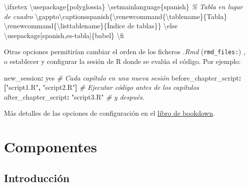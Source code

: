 \documentclass[
]{book}
\newenvironment{Shaded}{\begin{snugshade}}{\end{snugshade}}
\newcommand{\AttributeTok}[1]{\textcolor[rgb]{0.77,0.63,0.00}{#1}}
\newcommand{\BuiltInTok}[1]{#1}
\newcommand{\CharTok}[1]{\textcolor[rgb]{0.31,0.60,0.02}{#1}}
\newcommand{\CommentTok}[1]{\textcolor[rgb]{0.56,0.35,0.01}{\textit{#1}}}
\newcommand{\ExtensionTok}[1]{#1}
\newcommand{\FunctionTok}[1]{\textcolor[rgb]{0.00,0.00,0.00}{#1}}
\newcommand{\KeywordTok}[1]{\textcolor[rgb]{0.13,0.29,0.53}{\textbf{#1}}}
\newcommand{\NormalTok}[1]{#1}
\newcommand{\StringTok}[1]{\textcolor[rgb]{0.31,0.60,0.02}{#1}}
\theoremstyle{definition}
\theoremstyle{definition}
\theoremstyle{definition}
\theoremstyle{definition}
\theoremstyle{remark}
\begin{document}
\begin{Shaded}
\begin{Highlighting}[]
\FunctionTok{\textbackslash{}ifxetex}
  \BuiltInTok{\textbackslash{}usepackage}\NormalTok{\{}\ExtensionTok{polyglossia}\NormalTok{\}}
  \FunctionTok{\textbackslash{}setmainlanguage}\NormalTok{\{spanish\}}
  \CommentTok{\% Tabla en lugar de cuadro}
  \FunctionTok{\textbackslash{}gappto\textbackslash{}captionsspanish}\NormalTok{\{}\FunctionTok{\textbackslash{}renewcommand}\NormalTok{\{}\ExtensionTok{\textbackslash{}tablename}\NormalTok{\}\{Tabla\}  }
          \FunctionTok{\textbackslash{}renewcommand}\NormalTok{\{}\ExtensionTok{\textbackslash{}listtablename}\NormalTok{\}\{Índice de tablas\}\}}
\FunctionTok{\textbackslash{}else}
  \BuiltInTok{\textbackslash{}usepackage}\NormalTok{[spanish,es{-}tabla]\{}\ExtensionTok{babel}\NormalTok{\}}
\FunctionTok{\textbackslash{}fi}
\end{Highlighting}
\end{Shaded}

Otras opciones permitirían cambiar el orden de los ficheros \emph{.Rmd} (\texttt{rmd\_files:}) ,
o establecer y configurar la sesión de R donde se evalúa el código.
Por ejemplo:

\begin{Shaded}
\begin{Highlighting}[]
\FunctionTok{new\_session}\KeywordTok{:}\AttributeTok{ }\CharTok{yes}\CommentTok{                                    \# Cada capítulo en una nueva sesión}
\FunctionTok{before\_chapter\_script}\KeywordTok{:}\AttributeTok{ }\KeywordTok{[}\StringTok{"script1.R"}\KeywordTok{,}\AttributeTok{ }\StringTok{"script2.R"}\KeywordTok{]}\CommentTok{   \# Ejecutar código antes de los capítulos}
\FunctionTok{after\_chapter\_script}\KeywordTok{:}\AttributeTok{ }\StringTok{"script3.R"}\CommentTok{                   \# y después.}
\end{Highlighting}
\end{Shaded}

Más detalles de las opciones de configuración en el \href{https://bookdown.org/yihui/bookdown/configuration.html\#configuration}{libro de bookdown}.

\hypertarget{componentes}{%
\chapter{Componentes}\label{componentes}}

\hypertarget{introducciuxf3n}{%
\section{Introducción}\label{introducciuxf3n}}
\end{document}
